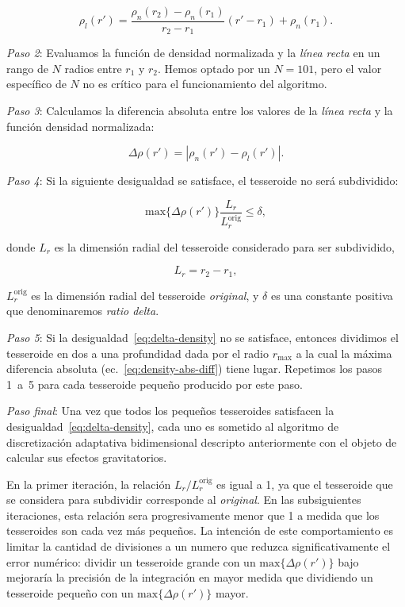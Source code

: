 \begin{equation}
    \rho_l(r') =
    \frac{ \rho_n(r_2) - \rho_n(r_1) }{ r_2 - r_1 } (r' - r_1) + \rho_n(r_1).
    \label{eq:density-reference-line}
\end{equation}

\textit{Paso 2}:
Evaluamos la función de densidad normalizada y la \emph{línea recta} en un
rango de $N$ radios entre $r_1$ y $r_2$. Hemos optado por un $N = 101$, pero el
valor específico de $N$ no es crítico para el funcionamiento del algoritmo.

\textit{Paso 3}:
Calculamos la diferencia absoluta entre los valores de la \emph{línea recta}
y la función densidad normalizada:

\begin{equation}
    \Delta \rho (r') = | \rho_n(r') - \rho_l(r') |.
    \label{eq:density-abs-diff}
\end{equation}

\textit{Paso 4}:
Si la siguiente desigualdad se satisface, el tesseroide no será subdividido:

\begin{equation}
    \text{max}\{ \Delta \rho(r') \} \frac{L_r}{L_r^\text{orig}} \le \delta,
    \label{eq:delta-density}
\end{equation}

\noindent
donde $L_r$ es la dimensión radial del tesseroide considerado para ser
subdividido,

\begin{equation}
    L_r = r_2 - r_1,
\end{equation}

\noindent $L_r^\text{orig}$ es la dimensión radial del tesseroide
\emph{original}, y $\delta$ es una constante positiva que denominaremos
\emph{ratio delta}.

\textit{Paso 5}:
Si la desigualdad~\ref{eq:delta-density} no se satisface, entonces dividimos el
tesseroide en dos a una profundidad dada por el radio $r_\text{max}$ a la cual
la máxima diferencia absoluta (ec.~\ref{eq:density-abs-diff}) tiene lugar.
Repetimos los pasos 1~a~5 para cada tesseroide pequeño producido por este paso.

\textit{Paso final}:
Una vez que todos los pequeños tesseroides satisfacen la
desigualdad~\ref{eq:delta-density}, cada uno es sometido al algoritmo de
discretización adaptativa bidimensional descripto anteriormente con el objeto
de calcular sus efectos gravitatorios.

En la primer iteración, la relación $L_r/L_r^\text{orig}$ es igual a 1, ya que
el tesseroide que se considera para subdividir corresponde al \emph{original}.
En las subsiguientes iteraciones, esta relación sera progresivamente menor que
1 a medida que los tesseroides son cada vez más pequeños.
La intención de este comportamiento es limitar la cantidad de divisiones a un
numero que reduzca significativamente el error numérico:
dividir un tesseroide grande con un $\text{max}\{ \Delta \rho(r') \}$ bajo
mejoraría la precisión de la integración en mayor medida que dividiendo un
tesseroide pequeño con un $\text{max}\{ \Delta \rho(r') \}$ mayor.

